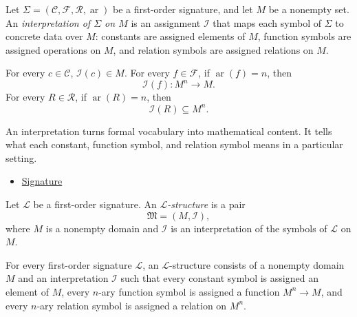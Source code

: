 \begin{definition}[Interpretation]
\label{def:axiom-systems-interpretation}
Let $\Sigma=(\mathcal{C},\mathcal{F},\mathcal{R},\operatorname{ar})$ be a
first-order signature, and let $M$ be a nonempty set. An
\emph{interpretation of $\Sigma$ on $M$} is an assignment $\mathcal{I}$ that
maps each symbol of $\Sigma$ to concrete data over $M$: constants are assigned
elements of $M$, function symbols are assigned operations on $M$, and relation
symbols are assigned relations on $M$.
\end{definition}

\begin{remark*}
For every $c\in\mathcal{C}$, $\mathcal{I}(c)\in M$. For every
$f\in\mathcal{F}$, if $\operatorname{ar}(f)=n$, then
\[
  \mathcal{I}(f):M^n\to M.
\]
For every $R\in\mathcal{R}$, if $\operatorname{ar}(R)=n$, then
\[
  \mathcal{I}(R)\subseteq M^n.
\]
\end{remark*}

\begin{remark*}[Interpretation]
An interpretation turns formal vocabulary into mathematical content. It tells
what each constant, function symbol, and relation symbol means in a particular
setting.
\end{remark*}

\begin{dependencies}
\begin{itemize}
  \item \hyperref[def:signature]{Signature}
\end{itemize}
\end{dependencies}

\begin{definition}
\label{def:axiom-systems-structure}
Let $\mathcal{L}$ be a first-order signature. An
\emph{$\mathcal{L}$-structure} is a pair
\[
  \mathfrak{M}=(M,\mathcal{I}),
\]
where $M$ is a nonempty domain and $\mathcal{I}$ is an interpretation of the
symbols of $\mathcal{L}$ on $M$.
\end{definition}

\begin{remark*}
For every first-order signature $\mathcal{L}$, an $\mathcal{L}$-structure
consists of a nonempty domain $M$ and an interpretation $\mathcal{I}$ such
that every constant symbol is assigned an element of $M$, every $n$-ary
function symbol is assigned a function $M^n\to M$, and every $n$-ary relation
symbol is assigned a relation on $M^n$.
\end{remark*}

